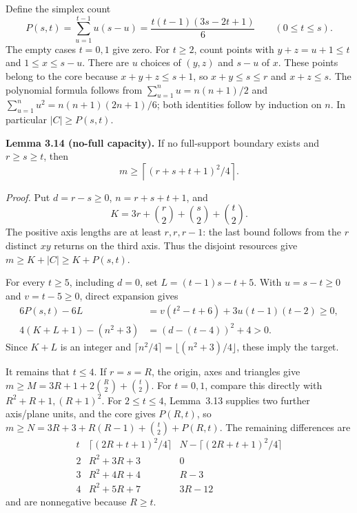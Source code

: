 \documentclass[11pt]{article}
\begin{document}
Define the simplex count
\[
P(s,t)=\sum_{u=1}^{t-1}u(s-u)
=\frac{t(t-1)(3s-2t+1)}6\qquad(0\le t\le s).
\]
The empty cases \(t=0,1\) give zero. For \(t\ge2\), count points with \(y+z=u+1\le t\) and \(1\le x\le s-u\). There are \(u\) choices of \((y,z)\) and \(s-u\) of \(x\). These points belong to the core because \(x+y+z\le s+1\), so \(x+y\le s\le r\) and \(x+z\le s\). The polynomial formula follows from \(\sum_{u=1}^{n}u=n(n+1)/2\) and \(\sum_{u=1}^{n}u^2=n(n+1)(2n+1)/6\); both identities follow by induction on \(n\). In particular \(|C|\ge P(s,t)\).

\label{res:A.22}\label{res:A.23}
\textbf{Lemma 3.14 (no-full capacity).}
If no full-support boundary exists and $r\ge s\ge t$, then
\[
 m\ge\left\lceil(r+s+t+1)^2/4\right\rceil.
\]

\emph{Proof.}
Put $d=r-s\ge0$, $n=r+s+t+1$, and
\[
 K=3r+\binom r2+\binom s2+\binom t2.
\]
The positive axis lengths are at least $r,r,r-1$: the last bound
follows from the $r$ distinct $xy$ returns on the third axis.
Thus the disjoint resources give $m\ge K+|C|\ge K+P(s,t)$.

For every $t\ge5$, including $d=0$, set $L=(t-1)s-t+5$.
With $u=s-t\ge0$ and $v=t-5\ge0$, direct expansion gives
\[
\begin{split}
 6P(s,t)-6L
 &=v(t^2-t+6)+3u(t-1)(t-2)\ge0,\\
 4(K+L+1)-(n^2+3)&=(d-(t-4))^2+4>0.
\end{split}
\]
Since $K+L$ is an integer and
$\lceil n^2/4\rceil=\lfloor(n^2+3)/4\rfloor$, these imply the target.

It remains that $t\le4$.  If $r=s=R$, the origin, axes and triangles
give $m\ge M=3R+1+2\binom R2+\binom t2$.
For $t=0,1$, compare this directly with $R^2+R+1,(R+1)^2$.
For $2\le t\le4$, Lemma~3.13 supplies two further axis/plane units,
and the core gives $P(R,t)$, so
$m\ge N=3R+3+R(R-1)+\binom t2+P(R,t)$.
The remaining differences are
\[
\begin{array}{c|c|c}
 t&\lceil(2R+t+1)^2/4\rceil&N-\lceil(2R+t+1)^2/4\rceil\\\hline
 2&R^2+3R+3&0\\
 3&R^2+4R+4&R-3\\
 4&R^2+5R+7&3R-12
\end{array}
\]
and are nonnegative because $R\ge t$.
\end{document}
